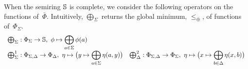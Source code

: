 %
%
\noindent
When the semiring $\mathbb{S}$ is complete, we
consider the following operators on the functions of~$\bar\Phi$. %
Intuitively, $\bigoplus_\Sigma$
returns the global minimum, \wrt $\leq_\oplus$, of functions of~$\Phi_\Sigma$.
\[
\begin{array}{ll}
\bigoplus_\Sigma : \Phi_\Sigma \to \mathbb{S},\
  \phi \mapsto \displaystyle\bigoplus_{a \in \Sigma} \phi(a)\\
\bigoplus^1_\Sigma :
  \Phi_{\Sigma,\Delta} \to \Phi_\Delta,\
  \eta \mapsto \bigl( y \mapsto \displaystyle\bigoplus_{a \in \Sigma} \eta(a, y) \bigr) &
\bigoplus^2_\Delta :
  \Phi_{\Sigma,\Delta} \to \Phi_\Sigma,\
  \eta \mapsto \bigl( x \mapsto \displaystyle\bigoplus_{b \in \Delta} \eta(x, b) \bigr)\\
\end{array}
\]
